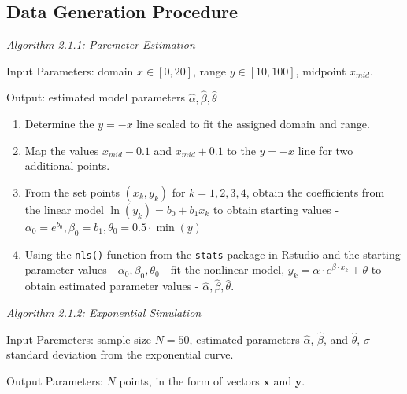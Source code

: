 \clearpage



\begin{appendix}
\clearpage
\appendix

\hypertarget{data-generation-procedure}{%
\section{\texorpdfstring{Data Generation
Procedure\label{app:generation}}{Data Generation Procedure}}\label{data-generation-procedure}}

\textit{Algorithm 2.1.1: Paremeter Estimation}

Input Parameters: domain \(x\in[0,20]\), range \(y\in[10,100]\),
midpoint \(x_{mid}\).

Output: estimated model parameters \(\hat\alpha, \hat\beta, \hat\theta\)

\begin{enumerate}
\def\labelenumi{\arabic{enumi}.}
\item
  Determine the \(y=-x\) line scaled to fit the assigned domain and
  range.
\item
  Map the values \(x_{mid} - 0.1\) and \(x_{mid} + 0.1\) to the \(y=-x\)
  line for two additional points.
\item
  From the set points \((x_k, y_k)\) for \(k = 1,2,3,4\), obtain the
  coefficients from the linear model \(\ln(y_k) = b_0 +b_1x_k\) to
  obtain starting values -
  \(\alpha_0 = e^{b_0}, \beta_0 = b_1, \theta_0 = 0.5\cdot \min(y)\)
\item
  Using the \texttt{nls()} function from the \texttt{stats} package in
  Rstudio and the starting parameter values -
  \(\alpha_0, \beta_0, \theta_0\) - fit the nonlinear model,
  \(y_k = \alpha\cdot e^{\beta\cdot x_k}+\theta\) to obtain estimated
  parameter values - \(\hat\alpha, \hat\beta, \hat\theta.\)
\end{enumerate}

\noindent\textit{Algorithm 2.1.2: Exponential Simulation}

Input Paremeters: sample size \(N = 50\), estimated parameters
\(\hat\alpha\), \(\hat\beta\), and \(\hat\theta\), \(\sigma\) standard
deviation from the exponential curve.

Output Parameters: \(N\) points, in the form of vectors \(\mathbf{x}\)
and \(\mathbf{y}\).


\end{appendix}
